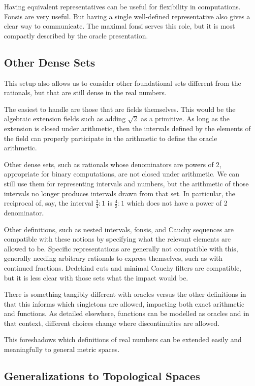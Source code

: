 \documentclass[12pt]{article}
\begin{document}
Having equivalent representatives can be useful for flexibility in computations. Fonsis are very useful. But having a single well-defined representative also gives a clear way to communicate. The maximal fonsi serves this role, but it is most compactly described by the oracle presentation. 

\subsection{Other Dense Sets}

This setup also allows us to consider other foundational sets different from the rationals, but that are still dense in the real numbers. 

The easiest to handle are those that are fields themselves. This would be the algebraic extension fields such as adding $\sqrt{2}$ as a primitive. As long as the extension is closed under arithmetic, then the intervals defined by the elements of the field can properly participate in the arithmetic to define the oracle arithmetic. 

Other dense sets, such as rationals whose denominators are powers of 2, appropriate for binary computations, are not closed under arithmetic. We can still use them for representing intervals and numbers, but the arithmetic of those intervals no longer produces intervals drawn from that set. In particular, the reciprocal of, say, the interval $\frac{3}{4}:1$ is $\frac{4}{3}:1$ which does not have a power of 2 denominator.  

Other definitions, such as nested intervals, fonsis, and Cauchy sequences are compatible with these notions by specifying what the relevant elements are allowed to be. Specific representations are generally not compatible with this, generally needing arbitrary rationals to express themselves, such as with continued fractions. Dedekind cuts and minimal Cauchy filters are compatible, but it is less clear with those sets what the impact would be. 

There is something tangibly different with oracles versus the other definitions in that this informs which singletons are allowed, impacting both exact arithmetic and functions. As detailed elsewhere, functions can be modelled as oracles and in that context, different choices change where discontinuities are allowed. 

This foreshadows which definitions of real numbers can be extended easily and meaningfully to general metric spaces. 


\subsection{Generalizations to Topological Spaces}
\end{document}
